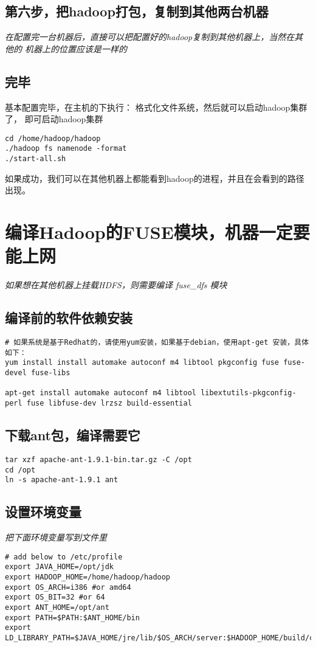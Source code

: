 \documentclass{article}
\begin{document}
\subsection{第六步，把hadoop打包，复制到其他两台机器}
\textit{在配置完一台机器后，直接可以把配置好的hadoop复制到其他机器上，当然在其他的
机器上的位置应该是一样的}

\subsection{完毕}
基本配置完毕，在主机的下执行：
 格式化文件系统，然后就可以启动hadoop集群了，
即可启动hadoop集群

\begin{verbatim}
cd /home/hadoop/hadoop
./hadoop fs namenode -format
./start-all.sh
\end{verbatim}

如果成功，我们可以在其他机器上都能看到hadoop的进程，并且在会看到的路径
出现。

\section{编译Hadoop的FUSE模块，机器一定要能上网}
\textit{如果想在其他机器上挂载HDFS，则需要编译 fuse\_dfs 模块}
\subsection{编译前的软件依赖安装}
\begin{verbatim}
# 如果系统是基于Redhat的，请使用yum安装，如果基于debian，使用apt-get 安装，具体如下：
yum install install automake autoconf m4 libtool pkgconfig fuse fuse-devel fuse-libs

apt-get install automake autoconf m4 libtool libextutils-pkgconfig-perl fuse libfuse-dev lrzsz build-essential
\end{verbatim}

\subsection{下载ant包，编译需要它}
\begin{verbatim}
tar xzf apache-ant-1.9.1-bin.tar.gz -C /opt
cd /opt
ln -s apache-ant-1.9.1 ant

\end{verbatim}

\subsection{设置环境变量}
\textit{把下面环境变量写到文件里}
\begin{verbatim}
# add below to /etc/profile
export JAVA_HOME=/opt/jdk
export HADOOP_HOME=/home/hadoop/hadoop
export OS_ARCH=i386 #or amd64
export OS_BIT=32 #or 64
export ANT_HOME=/opt/ant
export PATH=$PATH:$ANT_HOME/bin
export LD_LIBRARY_PATH=$JAVA_HOME/jre/lib/$OS_ARCH/server:$HADOOP_HOME/build/c++/Linux-$OS_ARCH-$OS_BIT/lib:/usr/local/lib:/usr/lib
\end{verbatim}
\end{document}
